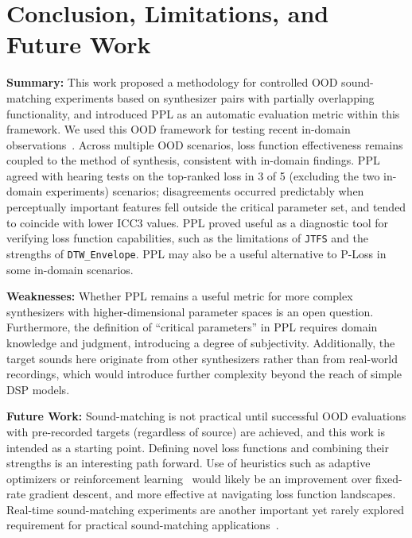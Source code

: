 \documentclass{article}
\newcommand{\SIMSESpec}{\texttt{SIMSE\_\allowbreak Spec}\xspace}
\newcommand{\LoneSpec}{\texttt{L1\_\allowbreak Spec}\xspace}
\newcommand{\JTFS}{\texttt{JTFS}\xspace}
\newcommand{\DTWEnv}{\texttt{DTW\_\allowbreak Envelope}\xspace}
\begin{document}


\section{Conclusion, Limitations, and Future Work}

\textbf{Summary:}  This work proposed a methodology for controlled OOD sound-matching experiments based on synthesizer pairs with partially overlapping functionality, and introduced PPL as an automatic evaluation metric within this framework. We used this OOD framework for testing recent in-domain observations~\cite{salimi2025evaluating,vahidi2023mesostructures}. Across multiple OOD scenarios, loss function effectiveness remains coupled to the method of synthesis, consistent with in-domain findings. PPL agreed with hearing tests on the top-ranked loss in 3 of 5 (excluding the two in-domain experiments) scenarios; disagreements occurred predictably when perceptually important features fell outside the critical parameter set, and tended to coincide with lower ICC3 values. PPL proved useful as a diagnostic tool for verifying loss function capabilities, such as the limitations of \JTFS and the strengths of \DTWEnv. PPL may also be a useful alternative to P-Loss in some in-domain scenarios.

\noindent \textbf{Weaknesses:} Whether PPL remains a useful metric for more complex synthesizers with higher-dimensional parameter spaces is an open question. Furthermore, the definition of ``critical parameters'' in PPL requires domain knowledge and judgment, introducing a degree of subjectivity. Additionally, the target sounds here originate from other synthesizers rather than from real-world recordings, which would introduce further complexity beyond the reach of simple DSP models.

\noindent  \textbf{Future Work:} Sound-matching is not practical until successful OOD evaluations with pre-recorded targets (regardless of source) are achieved, and this work is intended as a starting point. Defining novel loss functions and combining their strengths is an interesting path forward. Use of heuristics such as adaptive optimizers or reinforcement learning~\cite{sutton1998reinforcement} would likely be an improvement over fixed-rate gradient descent, and more effective at navigating loss function landscapes. Real-time sound-matching experiments are another important yet rarely explored requirement for practical sound-matching applications~\cite{shier2024real}. 
% 


\end{document}
